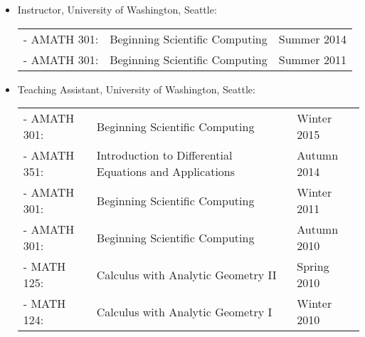 \documentclass{article}
\begin{document}
\begin{itemize}
  \item Instructor, University of Washington, Seattle:

    \begin{tabular}{lll}
      - AMATH 301: & Beginning Scientific Computing      & Summer 2014 \\
      - AMATH 301: & Beginning Scientific Computing      & Summer 2011 \\
    \end{tabular}

  \item Teaching Assistant, University of Washington, Seattle:

    \begin{tabular}{lll}
      - AMATH 301: & Beginning Scientific Computing      & Winter 2015 \\
      - AMATH 351: & Introduction to Differential Equations and Applications
                   & Autumn 2014 \\
      - AMATH 301: & Beginning Scientific Computing      & Winter 2011 \\
      - AMATH 301: & Beginning Scientific Computing      & Autumn 2010 \\
      - MATH 125:  & Calculus with Analytic Geometry II  & Spring 2010 \\
      - MATH 124:  & Calculus with Analytic Geometry I   & Winter 2010 \\
    \end{tabular}

\end{itemize}



\pagebreak











\end{document}
